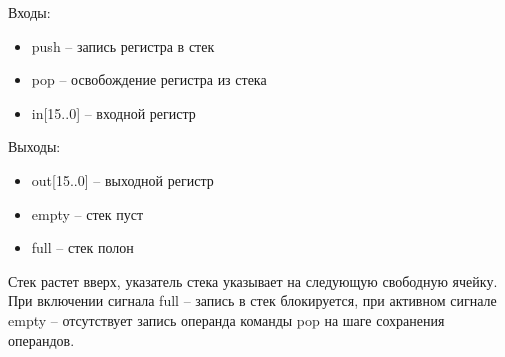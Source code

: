 Входы:
\begin{itemize}
    \item push -- запись регистра в стек
    \item pop -- освобождение регистра из стека
    \item in[15..0] -- входной регистр
\end{itemize}
Выходы:
\begin{itemize}
    \item out[15..0] -- выходной регистр
    \item empty -- стек пуст
    \item full -- стек полон
\end{itemize}
Стек растет вверх, указатель стека указывает на следующую свободную ячейку.
При включении сигнала full -- запись в стек блокируется, при активном сигнале empty -- отсутствует запись операнда команды pop на шаге сохранения операндов.

